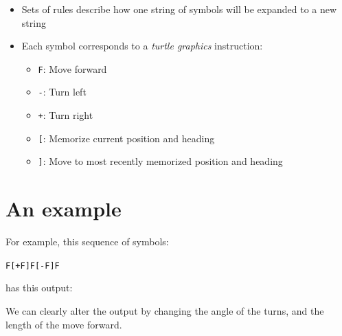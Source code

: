 \documentclass[bigger]{beamer}
\begin{document}
\begin{itemize}
\item Sets of rules describe how one string of symbols will be expanded to a new string
\item Each symbol corresponds to a \emph{turtle graphics} instruction:

\begin{itemize}
\item \texttt{F}: Move forward
\item \texttt{-}: Turn left
\item \texttt{+}: Turn right
\item \texttt{[}: Memorize current position and heading
\item \texttt{]}: Move to most recently memorized position and heading
\end{itemize}
\end{itemize}

\section*{An example}
\label{sec:org8056486}

For example, this sequence of symbols:

\texttt{F[+F]F[-F]F} 


has this output: 

We can clearly alter the output by changing the angle of the turns, 
and the length of the move forward.
\end{document}
